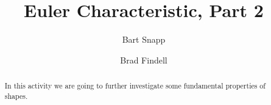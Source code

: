 \documentclass{ximera}
\title{Euler Characteristic, Part 2}
\author{Bart Snapp \and Brad Findell}
\begin{document}
\begin{abstract}
In this activity we are going to further investigate some fundamental
properties of shapes.
\end{abstract}
\maketitle


%
%
%
%
%
%
%
%
\end{document}
